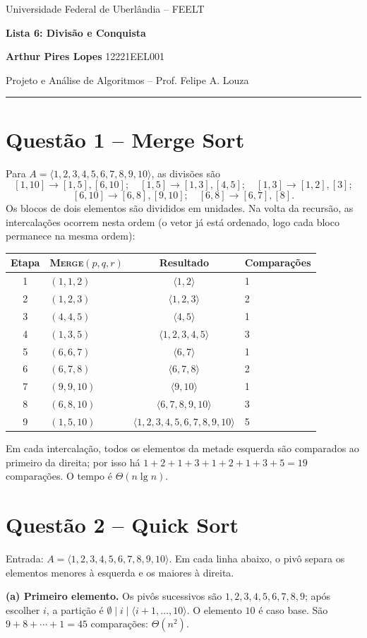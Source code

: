 \documentclass[10pt,a4paper]{article}
\newcommand{\questao}[1]{\section*{\color{azul}Questão #1}}
\newcommand{\vet}[1]{\langle #1\rangle}
\begin{document}
\begin{center}
{\small Universidade Federal de Uberlândia -- FEELT}\par
{\Large\bfseries\color{azul}Lista 6: Divisão e Conquista}\par
\textbf{Arthur Pires Lopes} \quad 12221EEL001\par
{\small Projeto e Análise de Algoritmos -- Prof. Felipe A. Louza}
\end{center}
\vspace{-6pt}\hrule

\questao{1 -- Merge Sort}
Para $A=\vet{1,2,3,4,5,6,7,8,9,10}$, as divisões são
\[
[1,10]\to[1,5],[6,10];\quad
[1,5]\to[1,3],[4,5];\quad [1,3]\to[1,2],[3];
\]
\vspace{-15pt}
\[
[6,10]\to[6,8],[9,10];\quad [6,8]\to[6,7],[8].
\]
Os blocos de dois elementos são divididos em unidades. Na volta da recursão, as intercalações ocorrem nesta ordem (o vetor já está ordenado, logo cada bloco permanece na mesma ordem):
\begin{center}
\begin{tabular}{@{}clcl@{}}
\toprule
Etapa & \textsc{Merge}$(p,q,r)$ & Resultado & Comparações\\
\midrule
1 & $(1,1,2)$ & $\vet{1,2}$ & 1\\
2 & $(1,2,3)$ & $\vet{1,2,3}$ & 2\\
3 & $(4,4,5)$ & $\vet{4,5}$ & 1\\
4 & $(1,3,5)$ & $\vet{1,2,3,4,5}$ & 3\\
5 & $(6,6,7)$ & $\vet{6,7}$ & 1\\
6 & $(6,7,8)$ & $\vet{6,7,8}$ & 2\\
7 & $(9,9,10)$ & $\vet{9,10}$ & 1\\
8 & $(6,8,10)$ & $\vet{6,7,8,9,10}$ & 3\\
9 & $(1,5,10)$ & $\vet{1,2,3,4,5,6,7,8,9,10}$ & 5\\
\bottomrule
\end{tabular}
\end{center}
Em cada intercalação, todos os elementos da metade esquerda são comparados ao primeiro da direita; por isso há $1+2+1+3+1+2+1+3+5=19$ comparações. O tempo é $\Theta(n\lg n)$.

\questao{2 -- Quick Sort}
Entrada: $A=\vet{1,2,3,4,5,6,7,8,9,10}$. Em cada linha abaixo, o pivô separa os elementos menores à esquerda e os maiores à direita.

\textbf{(a) Primeiro elemento.} Os pivôs sucessivos são $1,2,3,4,5,6,7,8,9$; após escolher $i$, a partição é $\emptyset\mid i\mid\vet{i+1,\ldots,10}$. O elemento $10$ é caso base. São $9+8+\cdots+1=45$ comparações: $\Theta(n^2)$.
\end{document}
